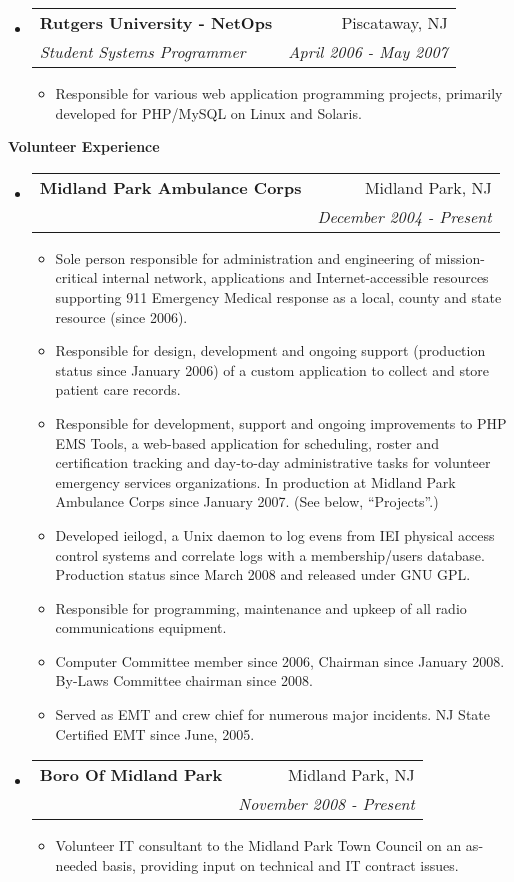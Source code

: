 \documentclass[letterpaper,11pt]{article}
\makeatletter
\newcommand{\resitem}[1]{\item #1 \vspace{-2pt}}
\newcommand{\resheading}[1]{{\large \colorbox{mygrey}{\begin{minipage}{\textwidth}{\textbf{#1 \vphantom{p\^{E}}}}\end{minipage}}}}
\newcommand{\ressubheading}[4]{
\begin{tabular*}{7.0in}{l@{\extracolsep{\fill}}r}
		\textbf{#1} & #2 \\
		\textit{#3} & \textit{#4} \\
\end{tabular*}\vspace{-6pt}}
\makeatother
\begin{document}
\begin{itemize}
\item
	\ressubheading{Rutgers University - NetOps}{Piscataway, NJ}{Student Systems Programmer}{April 2006 - May 2007}
	\begin{itemize}
		\resitem{Responsible for various web application programming projects, primarily developed for
                  PHP/MySQL on Linux and Solaris.}
	\end{itemize}

\end{itemize}

\pagebreak

\resheading{Volunteer Experience}
\begin{itemize}
\item
        \ressubheading{Midland Park Ambulance Corps}{Midland Park, NJ}{ }{December 2004 - Present}
        \begin{itemize}
                \resitem{Sole person responsible for administration and engineering of
                  mission-critical internal network, applications and
                  Internet-accessible resources supporting 911 Emergency
                  Medical response as a local, county and state resource
                  (since 2006).}
                \resitem{Responsible for design, development and ongoing support (production
                  status since January 2006) of a custom application to collect and store patient care records.}
                \resitem{Responsible for development, support and ongoing
                  improvements to PHP EMS Tools, a web-based application for
                  scheduling, roster and certification tracking and day-to-day
                administrative tasks for volunteer emergency services
                organizations. In production at Midland Park Ambulance Corps
                since January 2007. (See below, ``Projects''.)}
                \resitem{Developed ieilogd, a Unix daemon to log evens from
                  IEI physical access control systems and correlate logs with
                  a membership/users database. Production status since March
                  2008 and released under GNU GPL.}
                \resitem{Responsible for programming, maintenance and upkeep
                  of all radio communications equipment.}
                \resitem{Computer Committee member since 2006, Chairman since
                  January 2008. By-Laws Committee chairman since 2008.}
                \resitem{Served as EMT and crew chief for numerous major
                  incidents. NJ State Certified EMT since June, 2005.}
        \end{itemize}

\item
        \ressubheading{Boro Of Midland Park}{Midland Park, NJ}{}{November 2008 - Present}
        \begin{itemize}
                \resitem{Volunteer IT consultant to the Midland Park Town
                  Council on an as-needed basis, providing input on technical
                  and IT contract issues.}
        \end{itemize}
\end{itemize}
\end{document}
